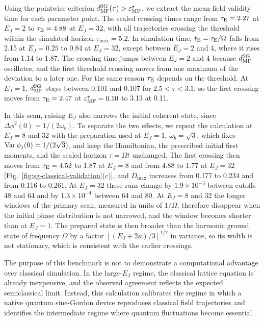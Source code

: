 \documentclass[pra,twocolumn,superscriptaddress,nofootinbib,floatfix]{revtex4-2}
\theoremstyle{remark}
\newcommand{\revcolor}{\color{blue}}
\DeclareRobustCommand{\rev}[1]{{\revcolor #1}}
\begin{document}
\rev{Using the pointwise criterion \(d_{\rm MF}^{\rm SG}(\tau)>\varepsilon_{\rm MF}^{\star}\), we extract the mean-field validity time for each parameter point.} \rev{The scaled crossing times range from \(\tau_{\rm E}=2.27\) at \(E_J=2\) to \(\tau_{\rm E}=4.88\) at \(E_J=32\), with all trajectories crossing the threshold within the simulated horizon \(\tau_{\max}=5.2\).} \rev{In simulation time, \(t_{\rm E}=\tau_{\rm E}/\Omega\) falls from 2.15 at \(E_J=0.25\) to 0.84 at \(E_J=32\), except between \(E_J=2\) and 4, where it rises from 1.14 to 1.87.} \rev{The crossing time jumps between \(E_J=2\) and 4 because \(d_{\rm MF}^{\rm SG}\) oscillates, and the first threshold crossing moves from one maximum of the deviation to a later one.} \rev{For the same reason \(\tau_{\rm E}\) depends on the threshold.} \rev{At \(E_J=1\), \(d_{\rm MF}^{\rm SG}\) stays between 0.101 and 0.107 for \(2.5<\tau<3.1\), so the first crossing moves from \(\tau_{\rm E}=2.47\) at \(\varepsilon^\star_{\rm MF}=0.10\) to 3.13 at 0.11.}

\rev{In this scan, raising \(E_J\) also narrows the initial coherent state, since \(\Delta\phi^2(0)=1/(2\omega_b)\).} \rev{To separate the two effects, we repeat the calculation at \(E_J=8\) and 32 with the preparation used at \(E_J=1\), \(\omega_b=\sqrt3\), which fixes \({\rm Var}\,\phi_j(0)=1/(2\sqrt3)\), and keep the Hamiltonian, the prescribed initial first moments, and the scaled horizon \(\tau=\Omega t\) unchanged.} \rev{The first crossing then moves from \(\tau_{\rm E}=4.52\) to 1.87 at \(E_J=8\) and from 4.88 to 1.77 at \(E_J=32\) [Fig.~\ref{fig:sg-classical-validation}(c)], and \(D_{\max}\) increases from 0.177 to 0.234 and from 0.116 to 0.261.} \rev{At \(E_J=32\) these runs change by \(1.9\times10^{-3}\) between cutoffs 48 and 64 and by \(1.3\times10^{-4}\) between 64 and 80.} \rev{At \(E_J=8\) and 32 the longer windows of the primary scan, measured in units of \(1/\Omega\), therefore disappear when the initial phase distribution is not narrowed, and the window becomes shorter than at \(E_J=1\).} \rev{The prepared state is then broader than the harmonic ground state of frequency \(\Omega\) by a factor \([(E_J+2\kappa)/3]^{1/2}\) in variance, so its width is not stationary, which is consistent with the earlier crossings.}

The purpose of this benchmark is not to demonstrate a computational advantage over classical simulation. In the large-\(E_J\) regime, the classical lattice equation is already inexpensive, and the observed agreement reflects the expected semiclassical limit. \rev{Instead, this calculation calibrates the regime in which a native quantum sine-Gordon device reproduces classical field trajectories and identifies the intermediate regime where quantum fluctuations become essential.}
\end{document}
